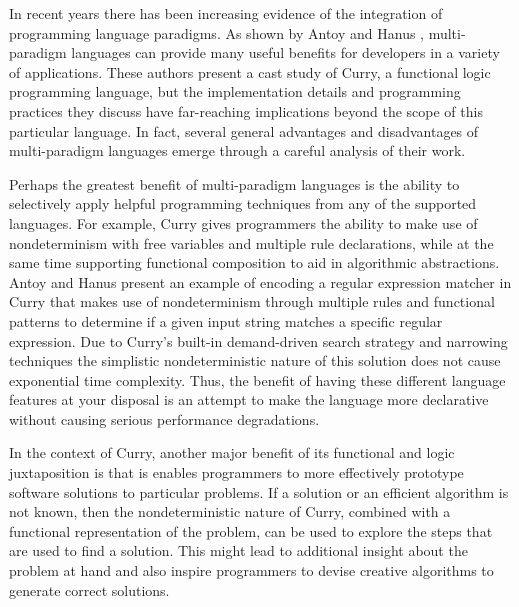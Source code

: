 \documentclass[12pt,letterpaper]{article}
\begin{document}
\begin{comment}
Fortunately, Curry's demand-driven search
strategy limits the computational overhead of the incorporating free variables into function parameters, so 
nondeterminism does not cause significant overhead and exponential time complexity when searching through the 
state space. In addition, the programmer can also modify the rules of the regular expression to place 
further constraints on the problem (such a technique is referred to as narrowing through ``constrained 
construction'').

Put another way, 
\end{comment}

In recent years there has been increasing evidence of the integration of programming language paradigms. As shown
by Antoy and Hanus \cite{Antoy2010}, multi-paradigm languages can provide many useful benefits for developers
in a variety of applications. These authors present a cast study of Curry, a functional logic programming language,
but the implementation details and programming practices they discuss have far-reaching implications beyond 
the scope of this particular language. In fact, several general advantages and disadvantages of multi-paradigm 
languages emerge through a careful analysis of their work.

Perhaps the greatest benefit of multi-paradigm languages is the ability to selectively apply helpful 
programming techniques from any of the supported languages. For example, Curry gives programmers the ability to 
make use of nondeterminism with free variables and multiple rule declarations, while at the same time 
supporting functional composition to aid in algorithmic abstractions. Antoy and Hanus present an example of 
encoding a regular expression matcher in Curry that makes use of nondeterminism through multiple rules and 
functional patterns to determine if a given input string matches a specific regular expression. Due to Curry's
built-in demand-driven search strategy and narrowing techniques the simplistic nondeterministic nature of this 
solution does not cause exponential time complexity. Thus, the benefit of having these different language features 
at your disposal is an attempt to make the language more declarative without causing serious performance
degradations.

In the context of Curry, another major benefit of its functional and logic juxtaposition is that 
is enables programmers to more effectively prototype software solutions to particular problems.
If a solution or an efficient algorithm is not known, then the nondeterministic nature of Curry, combined
with a functional representation of the problem, can be used to explore the steps that are used
to find a solution. This might lead to additional insight about the problem at hand and also inspire
programmers to devise creative algorithms to generate correct solutions. 
\end{document}
